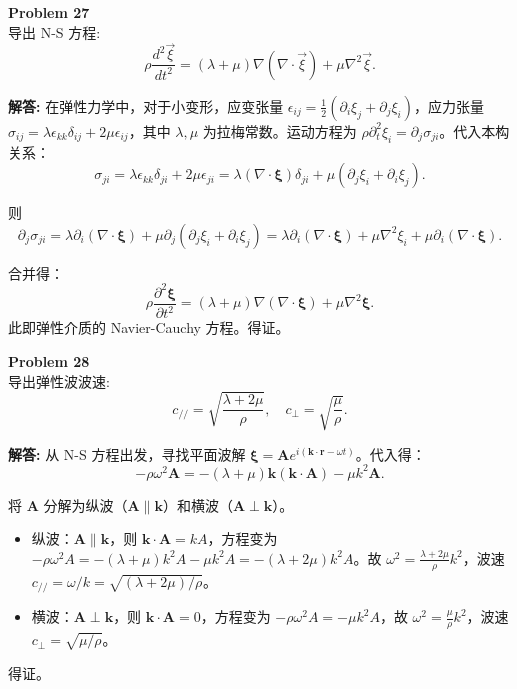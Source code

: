 \documentclass[12pt, a4paper, oneside]{ctexart}
\newenvironment{solution}{\par\noindent\textbf{解答:}\quad}{\par}
\begin{document}
\begin{mdframed}[backgroundcolor=gray!10, linewidth=0pt]
    \textbf{Problem 27} \\
    导出 N-S 方程:
    \[
    \rho \frac{d^2\vec{\xi}}{d t^2} = (\lambda+\mu)\nabla(\nabla\cdot\vec{\xi}) + \mu\nabla^2\vec{\xi}.
    \]
\end{mdframed}
\begin{solution}
    在弹性力学中，对于小变形，应变张量 \(\epsilon_{ij} = \frac{1}{2} (\partial_i \xi_j + \partial_j \xi_i)\)，应力张量 \(\sigma_{ij} = \lambda \epsilon_{kk} \delta_{ij} + 2\mu \epsilon_{ij}\)，其中 \(\lambda, \mu\) 为拉梅常数。运动方程为 \(\rho \partial_t^2 \xi_i = \partial_j \sigma_{ji}\)。代入本构关系：
    \[
    \sigma_{ji} = \lambda \epsilon_{kk} \delta_{ji} + 2\mu \epsilon_{ji} = \lambda (\nabla \cdot \boldsymbol{\xi}) \delta_{ji} + \mu (\partial_j \xi_i + \partial_i \xi_j).
    \]
    
    则
    \[
    \partial_j \sigma_{ji} = \lambda \partial_i (\nabla \cdot \boldsymbol{\xi}) + \mu \partial_j (\partial_j \xi_i + \partial_i \xi_j) = \lambda \partial_i (\nabla \cdot \boldsymbol{\xi}) + \mu \nabla^2 \xi_i + \mu \partial_i (\nabla \cdot \boldsymbol{\xi}).
    \]
    
    合并得：
    \[
    \rho \frac{\partial^2 \boldsymbol{\xi}}{\partial t^2} = (\lambda + \mu) \nabla (\nabla \cdot \boldsymbol{\xi}) + \mu \nabla^2 \boldsymbol{\xi}.
    \]
    此即弹性介质的 Navier-Cauchy 方程。得证。
\end{solution}

\begin{mdframed}[backgroundcolor=gray!10, linewidth=0pt]
    \textbf{Problem 28} \\
    导出弹性波波速:
    \[
    c_{//} = \sqrt{\frac{\lambda+2\mu}{\rho}}, \quad c_{\perp} = \sqrt{\frac{\mu}{\rho}}.
    \]
\end{mdframed}
\begin{solution}
    从 N-S 方程出发，寻找平面波解 \(\boldsymbol{\xi} = \mathbf{A} e^{i(\mathbf{k}\cdot\mathbf{r} - \omega t)}\)。代入得：
    \[
    -\rho \omega^2 \mathbf{A} = -(\lambda+\mu) \mathbf{k} (\mathbf{k} \cdot \mathbf{A}) - \mu k^2 \mathbf{A}.
    \]
    
    将 \(\mathbf{A}\) 分解为纵波（\(\mathbf{A} \parallel \mathbf{k}\)）和横波（\(\mathbf{A} \perp \mathbf{k}\)）。
    \begin{itemize}
        \item 纵波：\(\mathbf{A} \parallel \mathbf{k}\)，则 \(\mathbf{k} \cdot \mathbf{A} = k A\)，方程变为 \(-\rho \omega^2 A = -(\lambda+\mu) k^2 A - \mu k^2 A = -(\lambda+2\mu) k^2 A\)。故 \(\omega^2 = \frac{\lambda+2\mu}{\rho} k^2\)，波速 \(c_{//} = \omega/k = \sqrt{(\lambda+2\mu)/\rho}\)。
        \item 横波：\(\mathbf{A} \perp \mathbf{k}\)，则 \(\mathbf{k} \cdot \mathbf{A}=0\)，方程变为 \(-\rho \omega^2 A = -\mu k^2 A\)，故 \(\omega^2 = \frac{\mu}{\rho} k^2\)，波速 \(c_{\perp} = \sqrt{\mu/\rho}\)。
    \end{itemize}
    得证。
\end{solution}
\end{document}
